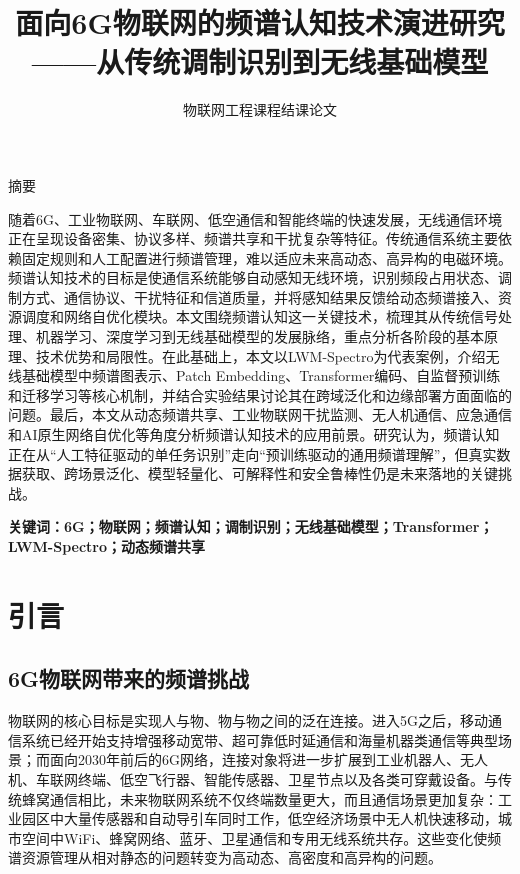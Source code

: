 \documentclass[UTF8,fontset=windows,zihao=-4]{ctexart}
\title{\heiti\zihao{2} 面向6G物联网的频谱认知技术演进研究\\[0.4em]
\Large ——从传统调制识别到无线基础模型}
\author{\zihao{-4} 物联网工程课程结课论文}
\date{}
\begin{document}
\pagestyle{plain}
\maketitle

\begin{center}
{\heiti{} 摘要}
\end{center}

\noindent 随着6G、工业物联网、车联网、低空通信和智能终端的快速发展，无线通信环境正在呈现设备密集、协议多样、频谱共享和干扰复杂等特征。传统通信系统主要依赖固定规则和人工配置进行频谱管理，难以适应未来高动态、高异构的电磁环境。频谱认知技术的目标是使通信系统能够自动感知无线环境，识别频段占用状态、调制方式、通信协议、干扰特征和信道质量，并将感知结果反馈给动态频谱接入、资源调度和网络自优化模块。本文围绕频谱认知这一关键技术，梳理其从传统信号处理、机器学习、深度学习到无线基础模型的发展脉络，重点分析各阶段的基本原理、技术优势和局限性。在此基础上，本文以LWM-Spectro为代表案例，介绍无线基础模型中频谱图表示、Patch Embedding、Transformer编码、自监督预训练和迁移学习等核心机制，并结合实验结果讨论其在跨域泛化和边缘部署方面面临的问题。最后，本文从动态频谱共享、工业物联网干扰监测、无人机通信、应急通信和AI原生网络自优化等角度分析频谱认知技术的应用前景。研究认为，频谱认知正在从“人工特征驱动的单任务识别”走向“预训练驱动的通用频谱理解”，但真实数据获取、跨场景泛化、模型轻量化、可解释性和安全鲁棒性仍是未来落地的关键挑战。

\noindent\textbf{关键词：6G；物联网；频谱认知；调制识别；无线基础模型；Transformer；LWM-Spectro；动态频谱共享}

\clearpage
\tableofcontents
\clearpage
\section{引言}
\subsection{6G物联网带来的频谱挑战}
物联网的核心目标是实现人与物、物与物之间的泛在连接。进入5G之后，移动通信系统已经开始支持增强移动宽带、超可靠低时延通信和海量机器类通信等典型场景；而面向2030年前后的6G网络，连接对象将进一步扩展到工业机器人、无人机、车联网终端、低空飞行器、智能传感器、卫星节点以及各类可穿戴设备\cite{itu2030}。与传统蜂窝通信相比，未来物联网系统不仅终端数量更大，而且通信场景更加复杂：工业园区中大量传感器和自动导引车同时工作，低空经济场景中无人机快速移动，城市空间中WiFi、蜂窝网络、蓝牙、卫星通信和专用无线系统共存。这些变化使频谱资源管理从相对静态的问题转变为高动态、高密度和高异构的问题。
\end{document}
